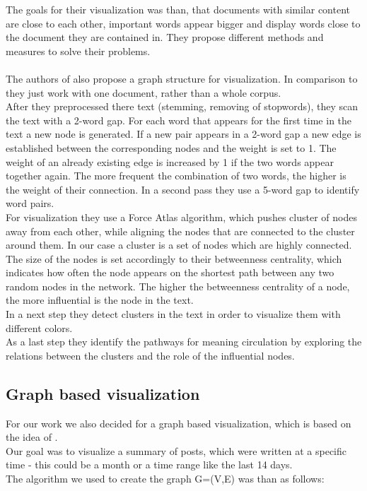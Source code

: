 The goals for their visualization was than, that documents with similar content are close to each other, important words appear bigger and display words close to the document they are contained in. 
They propose different methods and measures to solve their problems. \\
~\\
The authors of \cite{visualiuationCorpus3}  also propose a graph structure for visualization. In comparison to \cite{visualiuationCorpus2} they just work with one document, rather than a whole corpus. \\
After they preprocessed there text (stemming, removing of stopwords), they scan the text with a 2-word gap. For each word that appears for the first time in the text a new node is generated. If a new pair appears in a 2-word gap a new edge is established between the corresponding nodes and the weight is set to 1. The weight of an already existing edge is increased by 1 if the two words appear together again. The more frequent the combination of two words, the higher is the weight of their connection. In a second pass they use a 5-word gap to identify word pairs. \\
For visualization they use a Force Atlas algorithm, which pushes cluster of nodes away from each other, while aligning the nodes that are connected to the cluster around them. In our case a cluster is a set of nodes which are highly connected. \\
The size of the nodes is set accordingly to their betweenness centrality, which indicates how often the node appears on the shortest path between any two random nodes in the network. The higher the betweenness centrality of a node, the more influential is the node in the text. \\
In a next step they detect clusters in the text in order to visualize them with different colors. \\
As a last step they identify the pathways for meaning circulation by exploring the relations between the clusters and the role of the influential nodes.

\subsection{Graph based visualization} \label{sec:graphVisualization}

For our work we also decided for a graph based visualization, which is based on the idea of \cite{visualiuationCorpus3}. \\
Our goal was to visualize a summary of posts, which were written at a specific time - this could be a month or a time range like the last 14 days. \\
The algorithm we used to  create the graph G=(V,E) was than as follows: \\

